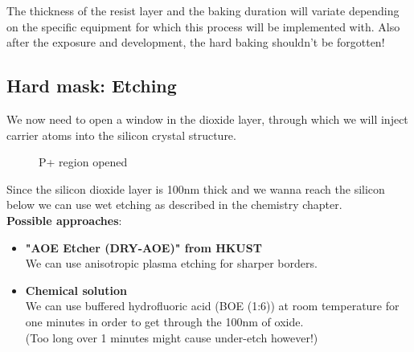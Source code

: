 The thickness of the resist layer and the baking duration will variate depending on the specific equipment for which this process will be implemented with.
Also after the exposure and development, the hard baking shouldn't be forgotten!

\newpage

\subsection{Hard mask: Etching}

We now need to open a window in the dioxide layer, through which we will inject carrier atoms into the silicon crystal structure.

\begin{figure}[H]
	\centering
	\begin{tikzpicture}[node distance = 3cm, auto, thick,scale=\CrossAndTopSection, every node/.style={transform shape}]
		
	\end{tikzpicture}
	\begin{tikzpicture}[node distance = 3cm, auto, thick,scale=\CrossAndTopSection, every node/.style={transform shape}]
		
	\end{tikzpicture}
	\drawStepArrow{}
	\begin{tikzpicture}[node distance = 3cm, auto, thick,scale=\CrossAndTopSection, every node/.style={transform shape}]
		
	\end{tikzpicture}
	\begin{tikzpicture}[node distance = 3cm, auto, thick,scale=\CrossAndTopSection, every node/.style={transform shape}]
		
	\end{tikzpicture}
	\caption{P+ region opened}
\end{figure}

Since the silicon dioxide layer is 100nm thick and we wanna reach the silicon below we can use wet etching as described in the chemistry chapter.\\

\textbf{Possible approaches}:
\begin{itemize}
	\item \textbf{"AOE Etcher (DRY-AOE)" from HKUST} \\
	We can use anisotropic plasma etching for sharper borders.
	\item \textbf{Chemical solution} \\
	We can use buffered hydrofluoric acid (BOE (1:6)) at room temperature for one minutes in order to get through the 100nm of oxide.\\
	(Too long over 1 minutes might cause under-etch however!)
\end{itemize}

